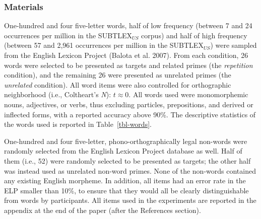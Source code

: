 \documentclass[
]{interact}
\begin{document}
\subsubsection{Materials}\label{sec-exp1-methods-materials}

One-hundred and four five-letter words, half of low frequency (between 7
and 24 occurrences per million in the SUBTLEX\(_{US}\) corpus) and half
of high frequency (between 57 and 2,961 occurrences per million in the
SUBTLEX\(_{US}\)) were sampled from the English Lexicon Project (Balota
et al. 2007). From each condition, 26 words were selected to be
presented as targets and related primes (the \emph{repetition}
condition), and the remaining 26 were presented as unrelated primes (the
\emph{unrelated} condition). All word items were also controlled for
orthographic neighborhood (i.e., Coltheart's \emph{N}): \(t \approx 0\).
All words used were monomorphemic nouns, adjectives, or verbs, thus
excluding particles, prepositions, and derived or inflected forms, with
a reported accuracy above 90\%. The descriptive statistics of the words
used is reported in Table~\ref{tbl-words}.

\begin{table}

\caption{\label{tbl-words}Descriptive statistics of the word items
used.}


\end{table}%

One-hundred and four five-letter, phono-orthographically legal non-words
were randomly selected from the English Lexicon Project database as
well. Half of them (i.e., 52) were randomly selected to be presented as
targets; the other half was instead used as unrelated non-word primes.
None of the non-words contained any existing English morpheme. In
addition, all items had an error rate in the ELP smaller than 10\%, to
ensure that they would all be clearly distinguishable from words by
participants. All items used in the experiments are reported in the
appendix at the end of the paper (after the References section).
\end{document}
